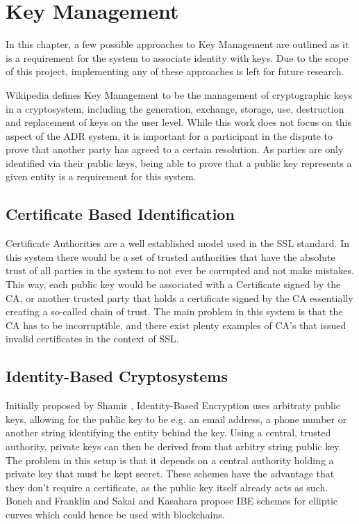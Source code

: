 \documentclass[12pt,msc,a4paper,oneside]{ucl_thesis}
\begin{document}
\chapter{Key Management} \label{chapter:key_management}
In this chapter, a few possible approaches to Key Management are outlined as it is a requirement for the system to associate identity with keys. Due to the scope of this project, implementing any of these approaches is left for future research.

Wikipedia \cite{wiki:key_management} defines Key Management to be the management of cryptographic keys in a cryptosystem, including the generation, exchange, storage, use, destruction and replacement of keys on the user level. While this work does not focus on this aspect of the ADR system, it is important for a participant in the dispute to prove that another party has agreed to a certain resolution. As parties are only identified via their public keys, being able to prove that a public key represents a given entity is a requirement for this system. 

\section{Certificate Based Identification}
Certificate Authorities are a well established model used in the SSL standard. In this system there would be a set of trusted authorities that have the absolute trust of all parties in the system to not ever be corrupted and not make mistakes. This way, each public key would be associated with a Certificate signed by the CA, or another trusted party that holds a certificate signed by the CA essentially creating a so-called chain of trust. The main problem in this system is that the CA has to be incorruptible, and there exist plenty examples of CA's that issued invalid certificates in the context of SSL.

\section{Identity-Based Cryptosystems}
Initially proposed by Shamir \cite{shamir1984identity}, Identity-Based Encryption uses arbitraty public keys, allowing for the public key to be e.g. an email address, a phone number or another string identifying the entity behind the key. Using a central, trusted authority, private keys can then be derived from that arbitry string public key. The problem in this setup is that it depends on a central authority holding a private key that must be kept secret. These schemes have the advantage that they don't require a certificate, as the public key itself already acts as such. Boneh and Franklin \cite{boneh2001identity} and Sakai and Kasahara \cite{sakai2003id} propose IBE schemes for elliptic curves which could hence be used with blockchains.
\end{document}
